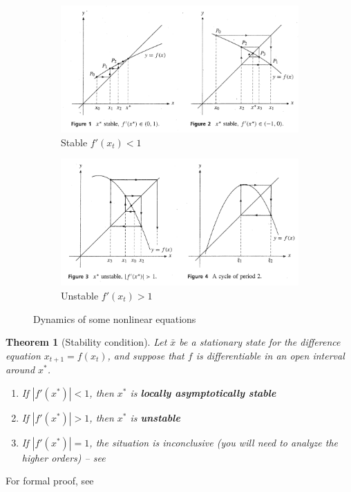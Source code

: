 \documentclass[11pt,a4paper]{book}
\newtheorem{theorem}{Theorem}[section]
\theoremstyle{definition}\newtheorem{definition}{Definition}
\theoremstyle{definition}\newtheorem{fact}{Fact}
\theoremstyle{definition}\newtheorem{remark}{Remark}
\theoremstyle{definition}\newtheorem{ex}{Ex.}
\theoremstyle{definition}\newtheorem{project}{Project}
\theoremstyle{definition}\newtheorem{problem}{Problem}
\theoremstyle{definition}\newtheorem{example}{Example}
\newenvironment{ftheorem}
{\begin{mdframed}\begin{theorem}}
		{\end{theorem}\end{mdframed}}
\numberwithin{theorem}{section}
\numberwithin{corollary}{chapter}
\numberwithin{assumption}{chapter}
\numberwithin{definition}{chapter}
\numberwithin{prop}{chapter}
\numberwithin{notation}{chapter}
\numberwithin{problem}{chapter}
\numberwithin{example}{chapter}
\numberwithin{fact}{chapter}
\numberwithin{ex}{chapter}
\begin{document}
	\begin{figure}[ht]
		\centering
		\begin{subfigure}[b]{0.63\textwidth}
			\includegraphics[width=1\linewidth]{figs/page417_1.png}
			\caption{Stable $f'(x_t) < 1$ }
			\label{fig:Ng1} 
		\end{subfigure}
		\begin{subfigure}[b]{0.63\textwidth}
			\includegraphics[width=1\linewidth]{figs/page417_2.png}
			\caption{Unstable $f'(x_t) > 1$}
			\label{fig:Ng2}
		\end{subfigure}
		\caption{Dynamics of some nonlinear equations \citep[p.420]{sydsaeter2008further}}
		\label{fig:diff2}
	\end{figure}
	
	\begin{ftheorem}[Stability condition] \label{theorem:stability}
		Let $\bar{x}$ be a stationary state for the difference equation $x_{t+1} = f(x_t)$, and suppose that $f$ is differentiable in an open interval around $x^*$.
		\begin{enumerate}
			\item If $|f'(x^*)| < 1$, then $x^*$ is \textbf{locally asymptotically stable}
			\item If $|f'(x^*)| > 1$, then $x^*$ is \textbf{unstable}
			\item If $|f'(x^*)| = 1$, the situation is inconclusive (you will need to analyze the higher orders) -- see \citet[p. 89]{shone2002economic}
		\end{enumerate}
	\end{ftheorem}
	For formal proof, see \citet[p.419]{sydsaeter2008further}
	
\end{document}
